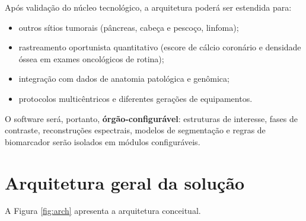 \documentclass[11pt,a4paper]{article}
\begin{document}
Após validação do núcleo tecnológico, a arquitetura poderá ser estendida para:

\begin{itemize}
\item outros sítios tumorais (pâncreas, cabeça e pescoço, linfoma);
\item rastreamento oportunista quantitativo (escore de cálcio coronário e densidade óssea em exames oncológicos de rotina);
\item integração com dados de anatomia patológica e genômica;
\item protocolos multicêntricos e diferentes gerações de equipamentos.
\end{itemize}

O software será, portanto, \textbf{órgão-configurável}: estruturas de interesse, fases de contraste, reconstruções espectrais, modelos de segmentação e regras de biomarcador serão isolados em módulos configuráveis.

\section{Arquitetura geral da solução}

A Figura \ref{fig:arch} apresenta a arquitetura conceitual.
\end{document}
